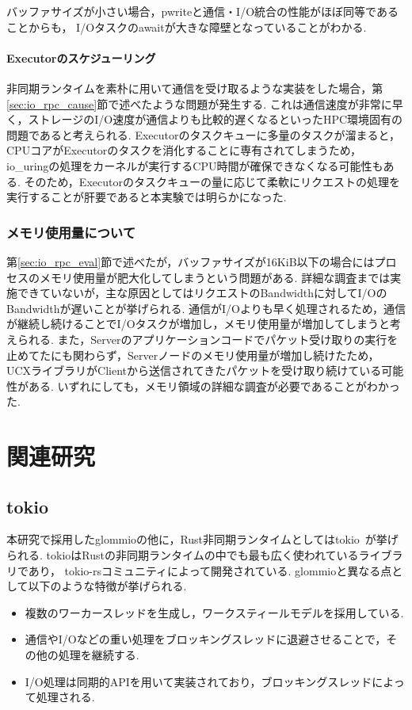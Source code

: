 \documentclass[a4paper,11pt]{jreport}
\begin{document}
バッファサイズが小さい場合，pwriteと通信・I/O統合の性能がほぼ同等であることからも，
I/Oタスクのawaitが大きな障壁となっていることがわかる.

\subsubsection{Executorのスケジューリング}
非同期ランタイムを素朴に用いて通信を受け取るような実装をした場合，第\ref{sec:io_rpc_cause}節で述べたような問題が発生する.
これは通信速度が非常に早く，ストレージのI/O速度が通信よりも比較的遅くなるといったHPC環境固有の問題であると考えられる.
Executorのタスクキューに多量のタスクが溜まると，CPUコアがExecutorのタスクを消化することに専有されてしまうため，
io\_uringの処理をカーネルが実行するCPU時間が確保できなくなる可能性もある.
そのため，Executorのタスクキューの量に応じて柔軟にリクエストの処理を実行することが肝要であると本実験では明らかになった.

\subsection{メモリ使用量について}
第\ref{sec:io_rpc_eval}節で述べたが，バッファサイズが16KiB以下の場合にはプロセスのメモリ使用量が肥大化してしまうという問題がある.
詳細な調査までは実施できていないが，主な原因としてはリクエストのBandwidthに対してI/OのBandwidthが遅いことが挙げられる.
通信がI/Oよりも早く処理されるため，通信が継続し続けることでI/Oタスクが増加し，メモリ使用量が増加してしまうと考えられる.
また，Serverのアプリケーションコードでパケット受け取りの実行を止めてたにも関わらず，Serverノードのメモリ使用量が増加し続けたため，
UCXライブラリがClientから送信されてきたパケットを受け取り続けている可能性がある.
いずれにしても，メモリ領域の詳細な調査が必要であることがわかった.

\chapter{関連研究}
\section{tokio}
本研究で採用したglommioの他に，Rust非同期ランタイムとしてはtokio~\cite{tokio}が挙げられる.
tokioはRustの非同期ランタイムの中でも最も広く使われているライブラリであり，
tokio-rsコミュニティによって開発されている.
glommioと異なる点として以下のような特徴が挙げられる.

\begin{itemize}
	\item 複数のワーカースレッドを生成し，ワークスティールモデルを採用している.
	\item 通信やI/Oなどの重い処理をブロッキングスレッドに退避させることで，その他の処理を継続する.
	\item I/O処理は同期的APIを用いて実装されており，ブロッキングスレッドによって処理される.
\end{itemize}
\end{document}
